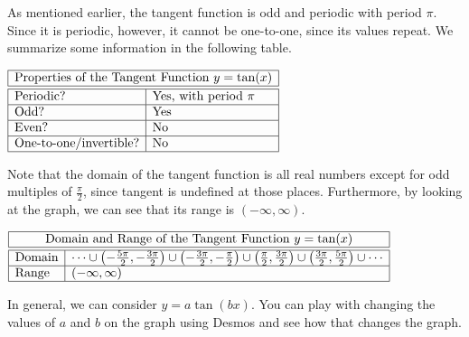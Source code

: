\documentclass[nooutcomes]{ximera}
\begin{document}
As mentioned earlier, the tangent function is odd and periodic with period $\pi$. Since it is periodic, however, it cannot be one-to-one, since its values repeat. We summarize some information in the following table.

\begin{center}
$
\begin{array}{|l|l|}
 \hline
 \multicolumn{2}{|c|}{\text{\normalfont Properties of the Tangent Function } y=\tan(x)} \\
\hline
 \hline
\text{Periodic?} & \text{Yes, with period }\pi \\ \hline
\text{Odd?} & \text{Yes} \\ \hline
\text{Even?} & \text{No} \\ \hline
\text{One-to-one/invertible?} & \text{No}\\
\hline
\end{array}
$
\end{center}

Note that the domain of the tangent function is all real numbers except for odd multiples of $\frac{\pi}{2}$, since tangent is undefined at those places. Furthermore, by looking at the graph, we can see that its range is $(-\infty, \infty)$.

\begin{center}
$
\begin{array}{|l|l|}
 \hline
 \multicolumn{2}{|c|}{\text{\normalfont Domain and Range of the Tangent Function } y=\tan(x)} \\
\hline
 \hline
\text{Domain} & \cdots \cup \left(-\frac{5\pi}{2}, -\frac{3\pi}{2}\right) \cup \left(-\frac{3\pi}{2}, -\frac{\pi}{2}\right) \cup \left(\frac{\pi}{2}, \frac{3\pi}{2}\right) \cup \left(\frac{3\pi}{2}, \frac{5\pi}{2}\right) \cup \cdots \\ \hline
\text{Range} & (-\infty, \infty) \\ \hline
\end{array}
$
\end{center}

In general, we can consider $y=a\tan(bx)$.  You can play with changing the values of $a$ and $b$ on the graph using Desmos and see how that changes the graph.  

\begin{center}  
\end{center}
\end{document}
